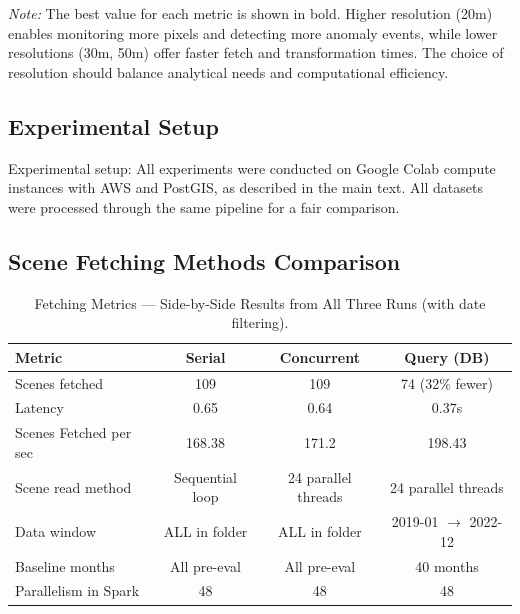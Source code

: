 \textit{Note:} The best value for each metric is shown in bold. Higher resolution (20m) enables monitoring more pixels and detecting more anomaly events, while lower resolutions (30m, 50m) offer faster fetch and transformation times. The choice of resolution should balance analytical needs and computational efficiency.

\subsection{Experimental Setup}
Experimental setup: All experiments were conducted on Google Colab compute instances with AWS and PostGIS, as described in the main text. All datasets were processed through the same pipeline for a fair comparison.

\subsection{Scene Fetching Methods Comparison}

\begin{table}[H]
\centering
\small
\begin{tabular}{|l|c|c|c|}
\hline
\textbf{Metric} & \textbf{Serial} & \textbf{Concurrent} & \textbf{Query (DB)} \\
\hline
Scenes fetched & 109 & 109 & 74 (32\% fewer) \\
Latency & 0.65 & 0.64 & 0.37s \\
Scenes Fetched per sec & 168.38 & 171.2 & 198.43 \\
Scene read method & Sequential loop & 24 parallel threads & 24 parallel threads \\
Data window & ALL in folder & ALL in folder & 2019-01 $\rightarrow$ 2022-12 \\
Baseline months & All pre-eval & All pre-eval & 40 months \\
Parallelism in Spark & 48 & 48 & 48 \\
\hline
\end{tabular}
\caption{Fetching Metrics --- Side-by-Side Results from All Three Runs (with date filtering).}
\label{tab:fetching_metrics_comparison}
\end{table}

